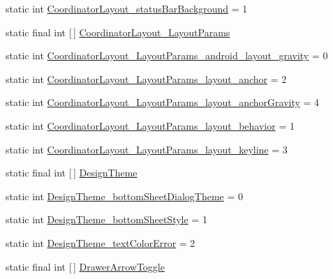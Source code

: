 \begin{DoxyCompactItemize}
\item 
static int \hyperlink{classandroid_1_1support_1_1v4_1_1R_1_1styleable_aaae28c830112a89e52658afe0c8b24dc}{Coordinator\+Layout\+\_\+status\+Bar\+Background} = 1
\item 
static final int \mbox{[}$\,$\mbox{]} \hyperlink{classandroid_1_1support_1_1v4_1_1R_1_1styleable_a9b9df68895be97c43703c5d0a130e2d9}{Coordinator\+Layout\+\_\+\+Layout\+Params}
\item 
static int \hyperlink{classandroid_1_1support_1_1v4_1_1R_1_1styleable_a112dbd54fb1cb541e46c2eee8c3317be}{Coordinator\+Layout\+\_\+\+Layout\+Params\+\_\+android\+\_\+layout\+\_\+gravity} = 0
\item 
static int \hyperlink{classandroid_1_1support_1_1v4_1_1R_1_1styleable_aa0e6a723ba8e1e1b09bbd5bbcd81a3f2}{Coordinator\+Layout\+\_\+\+Layout\+Params\+\_\+layout\+\_\+anchor} = 2
\item 
static int \hyperlink{classandroid_1_1support_1_1v4_1_1R_1_1styleable_aebf704b49b05009455d48c43457e5b46}{Coordinator\+Layout\+\_\+\+Layout\+Params\+\_\+layout\+\_\+anchor\+Gravity} = 4
\item 
static int \hyperlink{classandroid_1_1support_1_1v4_1_1R_1_1styleable_ab7698222e7d3cef07b5dfe63ccec5b53}{Coordinator\+Layout\+\_\+\+Layout\+Params\+\_\+layout\+\_\+behavior} = 1
\item 
static int \hyperlink{classandroid_1_1support_1_1v4_1_1R_1_1styleable_a13e230146baaab7d1d0d6379b87fbef8}{Coordinator\+Layout\+\_\+\+Layout\+Params\+\_\+layout\+\_\+keyline} = 3
\item 
static final int \mbox{[}$\,$\mbox{]} \hyperlink{classandroid_1_1support_1_1v4_1_1R_1_1styleable_ac24c90108ad2b0d7b729f30efc3f8de9}{Design\+Theme}
\item 
static int \hyperlink{classandroid_1_1support_1_1v4_1_1R_1_1styleable_a751b8940b6227f89ce627bab7a4782e0}{Design\+Theme\+\_\+bottom\+Sheet\+Dialog\+Theme} = 0
\item 
static int \hyperlink{classandroid_1_1support_1_1v4_1_1R_1_1styleable_af97dd7c6ce7914e917496c10a232ef71}{Design\+Theme\+\_\+bottom\+Sheet\+Style} = 1
\item 
static int \hyperlink{classandroid_1_1support_1_1v4_1_1R_1_1styleable_a6fcc0cb0fae8a6fc95519de5b4299973}{Design\+Theme\+\_\+text\+Color\+Error} = 2
\item 
static final int \mbox{[}$\,$\mbox{]} \hyperlink{classandroid_1_1support_1_1v4_1_1R_1_1styleable_af08d693b5d7faf0f18822ffe29c6028c}{Drawer\+Arrow\+Toggle}
\item 

\end{DoxyCompactItemize}
